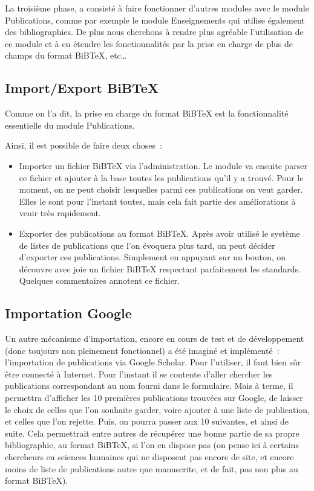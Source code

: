 \documentclass[final,11pt,a4paper,twoside,titlepage]{article}
\newcommand{\p}{\vspace{0.3em}}
\begin{document}
{    La troisième phase, a consisté à faire fonctionner d'autres modules avec le
    module Publications, comme par exemple le module Enseignements qui utilise
    également des bibliographies. De plus nous cherchons à rendre plus agréable
    l'utilisation de ce module et à en étendre les fonctionnalités par la prise
    en charge de plus de champs du format BiBTeX, etc\dots

    \subsection{Import/Export BiBTeX}
    Comme on l'a dit, la prise en charge du format BiBTeX est la fonctionnalité 
    essentielle du module Publications. 

    Ainsi, il est possible de faire deux choses~:
    \begin{itemize}
      \item Importer un fichier BiBTeX via l'administration. Le module va ensuite
	    parser ce fichier et ajouter à la base toutes les publications qu'il y a trouvé.
	    Pour le moment, on ne peut choisir lesquelles parmi ces publications on veut 
	    garder. Elles le sont pour l'instant toutes, mais cela fait partie
	    des améliorations à venir très rapidement.\p
  
      \item Exporter des publications au format BiBTeX. Après avoir utilisé le système
	    de listes de publications que l'on évoquera plus tard, on peut décider d'exporter
	    ces publications. Simplement en appuyant sur un bouton, on découvre avec joie un
	    fichier BiBTeX respectant parfaitement les standards. Quelques commentaires 
	    annotent ce fichier. 
    \end{itemize}

    \subsection{Importation Google}
    Un autre mécanisme d'importation, encore en cours de test et de développement (donc 
    toujours non pleinement fonctionnel) a été imaginé et implémenté~: l'importation
    de publications via Google Scholar. Pour l'utiliser, il faut bien sûr être connecté
    à Internet. Pour l'instant il se contente d'aller chercher les publications
    correspondant au nom fourni dans le formulaire. Mais à terme, il
    permettra d'afficher les 10 premières publications trouvées sur
    Google, de laisser le choix de celles que l'on souhaite garder,
    voire ajouter à une liste de publication, et celles que l'on
    rejette. Puis, on pourra passer aux 10 suivantes, et ainsi de
    suite. Cela permettrait entre autres de récupérer une bonne partie
    de sa propre bibliographie, au format BiBTeX, si l'on en dispose pas
    (on pense ici à certains chercheurs en sciences humaines qui ne
    disposent pas encore de site, et encore moins de liste de
    publications autre que manuscrite, et de fait, pas non plus au
    format BiBTeX).

}
\end{document}
